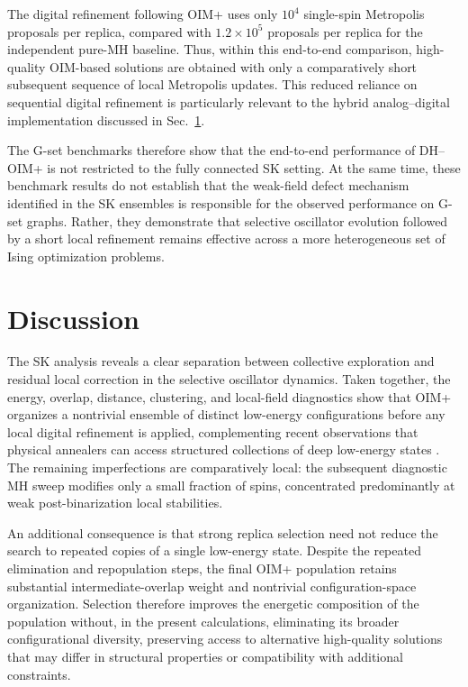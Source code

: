 \documentclass[
reprint,
amsmath,amssymb,
aps,
pre,
floatfix,
]{revtex4-2}
\begin{document}
The digital refinement following OIM+ uses only $10^4$ single-spin
Metropolis proposals per replica, compared with $1.2\times10^5$ proposals
per replica for the independent pure-MH baseline. Thus, within this
end-to-end comparison, high-quality OIM-based solutions are obtained with
only a comparatively short subsequent sequence of local Metropolis updates.
This reduced reliance on sequential digital refinement is particularly
relevant to the hybrid analog--digital implementation discussed in
Sec.~\ref{sec:disc}.

The G-set benchmarks therefore show that the end-to-end performance of
DH--OIM+ is not restricted to the fully connected SK setting. At the same
time, these benchmark results do not establish that the weak-field defect
mechanism identified in the SK ensembles is responsible for the observed
performance on G-set graphs. Rather, they demonstrate that selective
oscillator evolution followed by a short local refinement remains effective
across a more heterogeneous set of Ising optimization problems.

\section{Discussion}
\label{sec:disc}

The SK analysis reveals a clear separation between collective exploration and residual local correction in the selective oscillator dynamics. Taken together, the energy, overlap, distance, clustering, and local-field diagnostics show that OIM+ organizes a nontrivial ensemble of distinct low-energy configurations before any local digital refinement is applied, complementing recent observations that physical annealers can access structured collections of deep low-energy states \cite{Zhang2024Cyclic}. The remaining imperfections are comparatively local: the subsequent diagnostic MH sweep modifies only a small fraction of spins, concentrated predominantly at weak post-binarization local stabilities.



An additional consequence is that strong replica selection need not reduce
the search to repeated copies of a single low-energy state. Despite the
repeated elimination and repopulation steps, the final OIM+ population
retains substantial intermediate-overlap weight and nontrivial
configuration-space organization. Selection therefore improves the
energetic composition of the population without, in the present
calculations, eliminating its broader configurational diversity, preserving
access to alternative high-quality solutions that may differ in structural
properties or compatibility with additional constraints.
\end{document}
